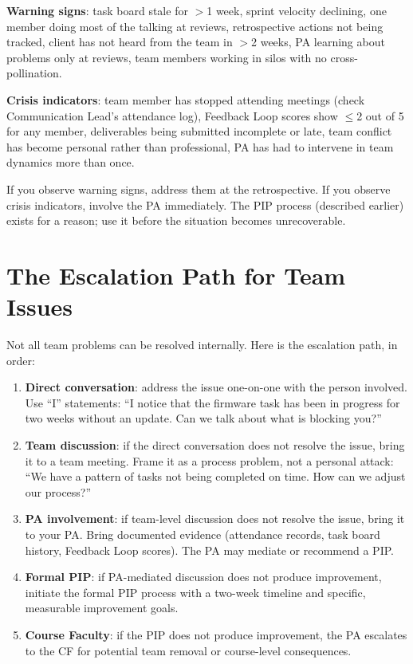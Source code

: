 \textbf{Warning signs}: task board stale for $>$1 week, sprint velocity declining, one member doing most of the talking at reviews, retrospective actions not being tracked, client has not heard from the team in $>$2 weeks, PA learning about problems only at reviews, team members working in silos with no cross-pollination.

\textbf{Crisis indicators}: team member has stopped attending meetings (check Communication Lead's attendance log), Feedback Loop scores show $\leq$2 out of 5 for any member, deliverables being submitted incomplete or late, team conflict has become personal rather than professional, PA has had to intervene in team dynamics more than once.

If you observe warning signs, address them at the retrospective. If you observe crisis indicators, involve the PA immediately. The PIP process (described earlier) exists for a reason; use it before the situation becomes unrecoverable.

\section{The Escalation Path for Team Issues}
Not all team problems can be resolved internally. Here is the escalation path, in order:

\begin{enumerate}[nosep,leftmargin=1.5em]
\item \textbf{Direct conversation}: address the issue one-on-one with the person involved. Use ``I'' statements: ``I notice that the firmware task has been in progress for two weeks without an update. Can we talk about what is blocking you?''
\item \textbf{Team discussion}: if the direct conversation does not resolve the issue, bring it to a team meeting. Frame it as a process problem, not a personal attack: ``We have a pattern of tasks not being completed on time. How can we adjust our process?''
\item \textbf{PA involvement}: if team-level discussion does not resolve the issue, bring it to your PA. Bring documented evidence (attendance records, task board history, Feedback Loop scores). The PA may mediate or recommend a PIP.
\item \textbf{Formal PIP}: if PA-mediated discussion does not produce improvement, initiate the formal PIP process with a two-week timeline and specific, measurable improvement goals.
\item \textbf{Course Faculty}: if the PIP does not produce improvement, the PA escalates to the CF for potential team removal or course-level consequences.
\end{enumerate}

